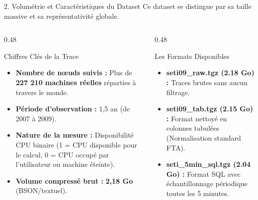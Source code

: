 \documentclass[10pt,aspectratio=169]{beamer}
\begin{document}
\begin{frame}{2. Volumétrie et Caractéristiques du Dataset}
  Ce dataset se distingue par sa taille massive et sa représentativité globale.
  
  \begin{columns}[T]
    \begin{column}{0.48\textwidth}
      \begin{block}{Chiffres Clés de la Trace}
        \begin{itemize}
          \item \textbf{Nombre de nœuds suivis :} Plus de \textbf{227 210 machines réelles} réparties à travers le monde.
          \item \textbf{Période d'observation :} 1,5 an (de 2007 à 2009).
          \item \textbf{Nature de la mesure :} Disponibilité CPU binaire (1 = CPU disponible pour le calcul, 0 = CPU occupé par l'utilisateur ou machine éteinte).
          \item \textbf{Volume compressé brut :} \textbf{2,18 Go} (BSON/textuel).
        \end{itemize}
      \end{block}
    \end{column}
    
    \begin{column}{0.48\textwidth}
      \begin{exampleblock}{Les Formats Disponibles}
        \begin{itemize}
          \item \textbf{seti09\_raw.tgz (2.18 Go) :} Traces brutes sans aucun filtrage.
          \item \textbf{seti09\_tab.tgz (2.15 Go) :} Format nettoyé en colonnes tabulées (Normalisation standard FTA).
          \item \textbf{seti\_5min\_sql.tgz (2.04 Go) :} Format SQL avec échantillonnage périodique toutes les 5 minutes.
        \end{itemize}
      \end{exampleblock}
    \end{column}
  \end{columns}
\end{frame}
\end{document}
